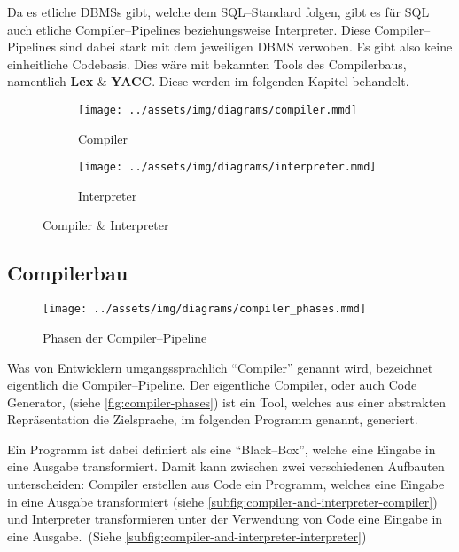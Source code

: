Da es etliche \acp{DBMS} gibt, welche dem \ac{SQL}--Standard folgen, gibt es für \ac{SQL} auch etliche Compiler--Pipelines beziehungsweise Interpreter.
Diese Compiler--Pipelines sind dabei stark mit dem jeweiligen \ac{DBMS} verwoben.
Es gibt also keine einheitliche Codebasis.
Dies wäre mit bekannten Tools des Compilerbaus, namentlich \textbf{Lex} \& \textbf{YACC}.
Diese werden im folgenden Kapitel behandelt.

\begin{figure}[ht]
    \begin{subfigure}[c]{0.5\textwidth}
        \begin{center}
            \texttt{[image: ../assets/img/diagrams/compiler.mmd]}
        \end{center}
        \caption{Compiler}
        \label{subfig:compiler-and-interpreter-compiler}
    \end{subfigure}
    \begin{subfigure}[c]{0.5\textwidth}
        \begin{center}
            \texttt{[image: ../assets/img/diagrams/interpreter.mmd]}
        \end{center}
        \caption{Interpreter}
        \label{subfig:compiler-and-interpreter-interpreter}
    \end{subfigure}
    \caption{Compiler \& Interpreter~\autocite{aho-2006}}
    \label{fig:compiler-and-interpreter}
\end{figure}
\newpage

\subsection{Compilerbau}\label{subsec:compilerbau}
\begin{wrapfigure}{rH}{0.5\textwidth}
    \begin{center}
        \texttt{[image: ../assets/img/diagrams/compiler\_phases.mmd]}
    \end{center}
    \caption{Phasen der Compiler--Pipeline~\autocite{aho-2006}}
    \label{fig:compiler-phases}
\end{wrapfigure}
Was von Entwicklern umgangssprachlich \enquote{Compiler} genannt wird, bezeichnet eigentlich die Compiler--Pipeline.
Der eigentliche Compiler, oder auch Code Generator, (siehe \autoref{fig:compiler-phases}) ist ein Tool, welches aus einer abstrakten Repräsentation die Zielsprache, im folgenden Programm genannt, generiert.

Ein Programm ist dabei definiert als eine \enquote{Black--Box}, welche eine Eingabe in eine Ausgabe transformiert.
Damit kann zwischen zwei verschiedenen Aufbauten unterscheiden: Compiler erstellen aus Code ein Programm, welches eine Eingabe in eine Ausgabe transformiert (siehe \autoref{subfig:compiler-and-interpreter-compiler}) und Interpreter transformieren unter der Verwendung von Code eine Eingabe in eine Ausgabe.~(Siehe \autoref{subfig:compiler-and-interpreter-interpreter})

